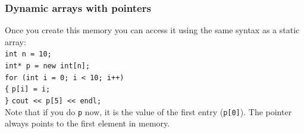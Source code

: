 \documentclass{if-beamer}
\begin{document}
\begin{frame}
\frametitle{\LARGE Dynamic arrays with pointers}
\vspace{1.2cm}
Once you create this memory you can access it using the same syntax as a static array:\\
\vspace{5pt}
\texttt{int n = 10;}\\
\texttt{int* p = new int[n];}\\
\texttt{for (int i = 0; i < 10; i++)}\\
\texttt{\{}
\texttt{p[i] = i;}\\
\texttt{\}}
\texttt{cout << p[5] << endl;}\\
\vspace{5pt}
Note that if you do \texttt{\textasteriskcentered p} now, it is the
value of the first entry (\texttt{p[0]}). The pointer always points to
the first element in memory.
\end{frame}
\end{document}
